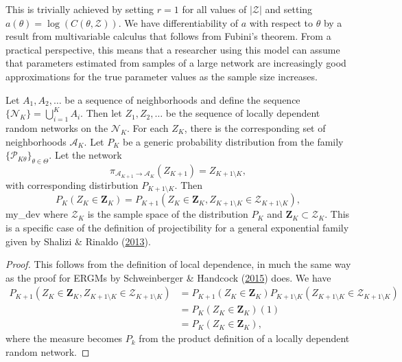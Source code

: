 \documentclass[12pt,twoside]{reedthesis}
\theoremstyle{definition}
\theoremstyle{definition}
\theoremstyle{remark}
\let\BeginKnitrBlock\begin \let\EndKnitrBlock\end
\begin{document}
This is trivially achieved by setting \(r = 1\) for all values of
\(\left| \mathcal{Z} \right|\) and setting
\(a(\theta) = \log(C(\theta, \mathcal{Z}))\). We have differentiability
of \(a\) with respect to \(\theta\) by a result from multivariable
calculus that follows from Fubini's theorem. From a practical
perspective, this means that a researcher using this model can assume
that parameters estimated from samples of a large network are
increasingly good approximations for the true parameter values as the
sample size increases.

\BeginKnitrBlock{theorem}
\protect\hypertarget{thm:consistency}{}{\label{thm:consistency}}Let
\(A_{1}, A_{2}, \dots\) be a sequence of neighborhoods and define the
sequence \(\{\mathcal{N}_{K}\} = \bigcup_{i = 1}^{K} A_{i}\). Then let
\(Z_{1}, Z_{2}, \dots\) be the sequence of locally dependent random
networks on the \(\mathcal{N}_K\). For each \(Z_K\), there is the
corresponding set of neighborhoods \(\mathcal{A}_K\). Let \(P_K\) be a
generic probability distribution from the family
\(\{\mathcal{P}_{K \theta}\}_{\theta \in \Theta}\). Let the network
\begin{equation*}
\pi_{\mathcal{A}_{K+1} \to \mathcal{A}_K}(Z_{K+1}) = Z_{K+1 \setminus K},
\end{equation*}
with corresponding distirbution \(P_{K+1 \setminus K}\). Then
\begin{equation}
    P_{K}(Z_{K} \in \mathbf{Z}_K) = P_{K+1}(Z_{K} \in \mathbf{Z}_K, Z_{K+1 \setminus K} \in \mathcal{Z}_{K+1 \setminus K}),
  \end{equation}
my\_dev where \(\mathcal{Z}_K\) is the sample space of the distribution
\(P_{K}\) and \(\mathbf{Z}_K \subset \mathcal{Z}_K\). This is a specific
case of the definition of projectibility for a general exponential
family given by Shalizi \& Rinaldo
(\protect\hyperlink{ref-Shalizi2013}{2013}).
\EndKnitrBlock{theorem}

\BeginKnitrBlock{proof}
{} This follows from the definition of local
dependence, in much the same way as the proof for ERGMs by Schweinberger
\& Handcock (\protect\hyperlink{ref-Schweinberger2015}{2015}) does. We
have
\begin{align*}
    P_{K+1}(Z_{K} \in \mathbf{Z}_K, Z_{K+1 \setminus K} \in \mathcal{Z}_{K+1 \setminus K}) &= P_{K+1}(Z_{K} \in \mathbf{Z}_K) P_{K+1 \setminus K}(Z_{K+1 \setminus K} \in \mathcal{Z}_{K+1 \setminus K}) \\
    &= P_{K}(Z_{K} \in \mathbf{Z}_K) (1) \\
    &= P_{K}(Z_{K} \in \mathbf{Z}_K),
  \end{align*}
where the measure becomes \(P_k\) from the product definition of a
locally dependent random network. \qedhere
\EndKnitrBlock{proof}
\end{document}
